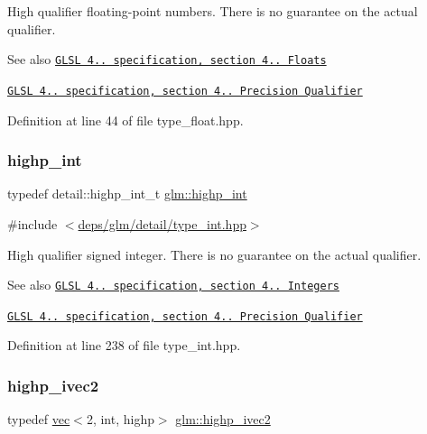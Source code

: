 High qualifier floating-\/point numbers. There is no guarantee on the actual qualifier.

\begin{DoxySeeAlso}{See also}
\href{http://www.opengl.org/registry/doc/GLSLangSpec.4.20.8.pdf}{\tt G\+L\+SL 4.. specification, section 4.. Floats} 

\href{http://www.opengl.org/registry/doc/GLSLangSpec.4.20.8.pdf}{\tt G\+L\+SL 4.. specification, section 4.. Precision Qualifier} 
\end{DoxySeeAlso}


Definition at line 44 of file type\+\_\+float.\+hpp.

\mbox{\label{group__core__precision_gaafed5240eb0a43328cb75faf5fb0a8c2}} 
\subsubsection{\texorpdfstring{highp\+\_\+int}{highp\_int}}
{\footnotesize\ttfamily typedef detail\+::highp\+\_\+int\+\_\+t \hyperlink{group__core__precision_gaafed5240eb0a43328cb75faf5fb0a8c2}{glm\+::highp\+\_\+int}}



{\ttfamily \#include $<$\hyperlink{type__int_8hpp}{deps/glm/detail/type\+\_\+int.\+hpp}$>$}

High qualifier signed integer. There is no guarantee on the actual qualifier.

\begin{DoxySeeAlso}{See also}
\href{http://www.opengl.org/registry/doc/GLSLangSpec.4.20.8.pdf}{\tt G\+L\+SL 4.. specification, section 4.. Integers} 

\href{http://www.opengl.org/registry/doc/GLSLangSpec.4.20.8.pdf}{\tt G\+L\+SL 4.. specification, section 4.. Precision Qualifier} 
\end{DoxySeeAlso}


Definition at line 238 of file type\+\_\+int.\+hpp.

\mbox{\label{group__core__precision_gad2b0693752b92e6644be9f1c3e50a451}} 
\subsubsection{\texorpdfstring{highp\+\_\+ivec2}{highp\_ivec2}}
{\footnotesize\ttfamily typedef \hyperlink{structglm_1_1vec}{vec}$<$2, int, highp$>$ \hyperlink{group__core__precision_gad2b0693752b92e6644be9f1c3e50a451}{glm\+::highp\+\_\+ivec2}}



